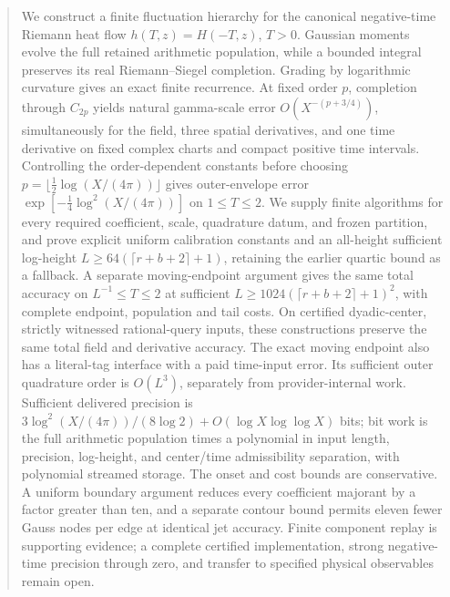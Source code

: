 \begin{abstract}
We construct a finite fluctuation hierarchy for the canonical negative-time
Riemann heat flow \(h(T,z)=H(-T,z)\), \(T>0\). Gaussian moments evolve
the full retained arithmetic population, while a bounded integral preserves
its real Riemann--Siegel completion. Grading by logarithmic curvature gives
an exact finite recurrence. At fixed order \(p\), completion through
\(C_{2p}\) yields natural gamma-scale error \(O(X^{-(p+3/4)})\),
simultaneously for the field, three spatial derivatives, and one time
derivative on fixed complex charts and compact positive time intervals.
Controlling the order-dependent constants before choosing
\(p=\lfloor\tfrac12\log(X/(4\pi))\rfloor\) gives outer-envelope error
\(\exp[-\tfrac14\log^2(X/(4\pi))]\) on \(1\le T\le2\).
We supply finite algorithms for every required coefficient, scale,
quadrature datum, and frozen partition, and prove explicit uniform
calibration constants and an all-height sufficient log-height
\(L\ge64(\lceil r+b+2\rceil+1)\), retaining the earlier quartic bound
as a fallback. A separate moving-endpoint argument gives the same total
accuracy on \(L^{-1}\le T\le2\) at sufficient
\(L\ge1024(\lceil r+b+2\rceil+1)^2\), with complete endpoint,
population and tail costs. On certified
dyadic-center, strictly witnessed rational-query inputs, these constructions
preserve the same total field and derivative accuracy. The exact moving
endpoint also has a literal-tag interface with a paid time-input error.
Its sufficient outer quadrature order is \(O(L^3)\), separately from
provider-internal work. Sufficient delivered precision
is \(3\log^2(X/(4\pi))/(8\log2)+O(\log X\log\log X)\) bits;
bit work is the full arithmetic population times a polynomial in input
length, precision, log-height, and center/time admissibility separation, with polynomial
streamed storage. The onset and cost bounds are conservative.
A uniform boundary argument reduces every coefficient majorant by
a factor greater than ten, and a separate contour bound permits eleven
fewer Gauss nodes per edge at identical jet accuracy.
Finite component replay is supporting evidence; a complete certified
implementation, strong negative-time precision through zero, and transfer
to specified physical observables remain open.
\end{abstract}

